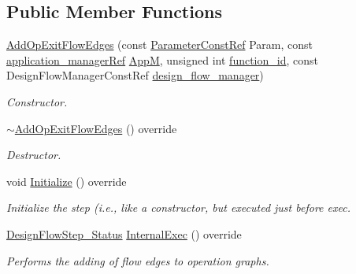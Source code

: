 \subsection*{Public Member Functions}
\begin{DoxyCompactItemize}
\item 
\hyperlink{classAddOpExitFlowEdges_a2d7887a62f52690db79ff3a7cc402be1}{Add\+Op\+Exit\+Flow\+Edges} (const \hyperlink{Parameter_8hpp_a37841774a6fcb479b597fdf8955eb4ea}{Parameter\+Const\+Ref} Param, const \hyperlink{application__manager_8hpp_a04ccad4e5ee401e8934306672082c180}{application\+\_\+manager\+Ref} \hyperlink{classFrontendFlowStep_a0ac0d8db2a378416583f51c4faa59d15}{AppM}, unsigned int \hyperlink{classFunctionFrontendFlowStep_a58ef2383ad1a212a8d3f396625a4b616}{function\+\_\+id}, const Design\+Flow\+Manager\+Const\+Ref \hyperlink{classDesignFlowStep_ab770677ddf087613add30024e16a5554}{design\+\_\+flow\+\_\+manager})
\begin{DoxyCompactList}\small\item\em Constructor. \end{DoxyCompactList}\item 
\hyperlink{classAddOpExitFlowEdges_aa8222b8eb47330a6616fc07f329b8073}{$\sim$\+Add\+Op\+Exit\+Flow\+Edges} () override
\begin{DoxyCompactList}\small\item\em Destructor. \end{DoxyCompactList}\item 
void \hyperlink{classAddOpExitFlowEdges_a62e837ee9c075439de0fbe4155c32de0}{Initialize} () override
\begin{DoxyCompactList}\small\item\em Initialize the step (i.\+e., like a constructor, but executed just before exec. \end{DoxyCompactList}\item 
\hyperlink{design__flow__step_8hpp_afb1f0d73069c26076b8d31dbc8ebecdf}{Design\+Flow\+Step\+\_\+\+Status} \hyperlink{classAddOpExitFlowEdges_a2fff48c7aee4af42bd8b509af08c40e5}{Internal\+Exec} () override
\begin{DoxyCompactList}\small\item\em Performs the adding of flow edges to operation graphs. \end{DoxyCompactList}\end{DoxyCompactItemize}
